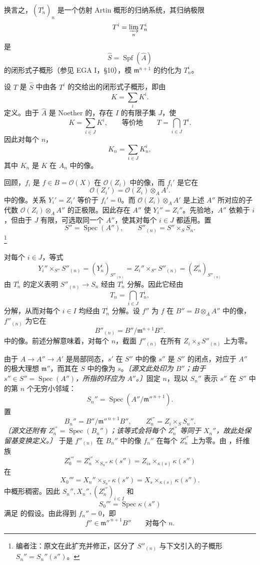 换言之，\((T_n^i)_n\) 是一个仿射 Artin 概形的归纳系统，其归纳极限
\[
  T^i=\varinjlim_nT_n^i
\]
是
\[
  \widehat S=\operatorname{Spf}(\widehat A)
\]
的闭形式子概形（参见 EGA I，\S10），模 \(\mathfrak m^{n+1}\) 的约化为 \(T_n^i\)。

设 \(T\) 是 \(\widehat S\) 中由各 \(T^i\) 的交给出的闭形式子概形，即由
\[
  K=\sum_iK^i.
\]
定义。由于 \(\widehat A\) 是 Noether 的，存在 \(I\) 的有限子集 \(J\)，使
\[
  K=\sum_{i\in J}K^i,
  \qquad\text{等价地}\qquad
  T=\bigcap_{i\in J}T^i.
\]
因此对每个 \(n\)，
\[
  K_n=\sum_{i\in J}K_n^i,
\]
其中 \(K_n\) 是 \(K\) 在 \(A_n\) 中的像。

回顾，\(f_i\) 是 \(f\in B=\mathscr O(X)\) 在 \(\mathscr O(Z_i)\) 中的像，而 \(f_i'\) 是它在
\[
  \mathscr O(Z_i')
  =\mathscr O(Z_i)\otimes_AA'.
\]
中的像。关系 \(Y_i'=Z_i'\) 等价于 \(f_i'=0\)。而 \(\mathscr O(Z_i)\otimes_AA'\) 是上述 \(A''\) 所对应的子代数 \(\mathscr O(Z_i)\otimes_AA''\) 的正极限。因此存在 \(A''\) 使 \(Y_i''=Z_i''\)。先验地，\(A''\) 依赖于 \(i\)，但由于 \(J\) 有限，可选取同一个 \(A''\)，使其对每个 \(i\in J\) 都适用。置
\[
  S''=\operatorname{Spec}(A''),
  \qquad
  S''_{(n)}=S''\times_SS_n.
\]
\footnote{编者注：原文在此扩充并修正，区分了 \(S''_{(n)}\) 与下文引入的子概形 \(S_n''=S_n''(s'')\)。}

对每个 \(i\in J\)，等式
\[
  Y_i''\times_{S''}S''_{(n)}
  =(Y_n^i)_{S''_{(n)}}
  =Z_i''\times_{S''}S''_{(n)}
  =(Z_n^i)_{S''_{(n)}}
\]
由 \(T_n^i\) 的定义表明 \(S''_{(n)}\to S_n\) 经由 \(T_n^i\) 分解。因此它经由
\[
  T_n=\bigcap_{i\in J}T_n^i,
\]
分解，从而对每个 \(i\in I\) 均经由 \(T_n^i\) 分解。设 \(f''\) 为 \(f\) 在 \(B''=B\otimes_AA''\) 中的像，\(f''_{(n)}\) 为它在
\[
  B''_{(n)}=B''/\mathfrak m^{n+1}B''.
\]
中的像。前述分解意味着，对每个 \(n\)，截面 \(f''_{(n)}\) 在所有 \(Z_i\times_SS''_{(n)}\) 上为零。

由于 \(A\to A''\to A'\) 是局部同态，\(s'\) 在 \(S''\) 中的像 \(s''\) 是 \(S''\) 的闭点，对应于 \(A''\) 的极大理想 \(\mathfrak m''\)，而其在 \(S\) 中的像为 \(s\)。\emph{〔源文此处印为 \(B''\)；由于 \(s''\in S''=\operatorname{Spec}(A'')\)，所指的环应为 \(A''\)。〕}固定 \(n\)，现以 \(S_n''\) 表示 \(s''\) 在 \(S''\) 中的第 \(n\) 个无穷小邻域：
\[
  S_n''=\operatorname{Spec}(A''/\mathfrak m''^{\,n+1}).
\]
置
\[
  B_n''=B''/\mathfrak m''^{\,n+1}B'',
  \qquad
  Z_{n}^{i''}=Z_i\times_SS_n''.
\]
\emph{〔源文还附有 \(Z_n^{i''}=\operatorname{Spec}(B_n'')\)；该等式会将每个 \(Z_n^{i''}\) 等同于 \(X_n''\)，故此处保留基变换定义。〕}
于是 \(f''_{(n)}\) 在 \(B_n''\) 中的像 \(f_n''\) 在每个 \(Z_n^{i''}\) 上为零。由 ，纤维族
\[
  Z_0^{i'''}
  =Z_n^{i''}\times_{S_n''}\kappa(s'')
  =Z_{is}\times_{\kappa(s)}\kappa(s'')
\]
在
\[
  X_0'''
  =X_n''\times_{S_n''}\kappa(s'')
  =X_s\times_{\kappa(s)}\kappa(s'').
\]
中概形稠密。因此 \(S_n'',X_n'',(Z_n^{i''})_{i\in I}\) 和
\[
  S_0'''=\operatorname{Spec}\kappa(s'')
\]
满足  的假设。由此得到 \(f_n''=0\)，即
\[
  f''\in\mathfrak m''^{\,n+1}B''
  \qquad\text{对每个 }n.
\]

